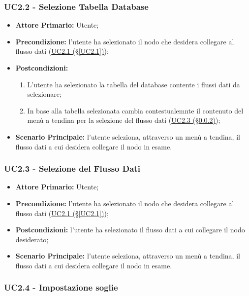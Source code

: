 \subsubsection{UC2.2 - Selezione Tabella Database}\label{UC2.2}
\begin{itemize}
\item \textbf{Attore Primario:} Utente;
\item \textbf{Precondizione:} l'utente ha selezionato il nodo che desidera collegare al flusso dati 					(\hyperref[UC2.1]{UC2.1 (§\ref*{UC2.1})});
\item \textbf{Postcondizioni:}
	\begin{enumerate}
	\item L'utente ha selezionato la tabella del database contente i flussi dati da selezionare;
	\item In base alla tabella selezionata cambia contestualemnte il contenuto del menù a tendina per la selezione del flusso dati (\hyperref[UC2.3]{UC2.3 (§\ref*{UC2.3})});
	\end{enumerate}
\item \textbf{Scenario Principale:} l'utente seleziona, attraverso un menù a tendina, il flusso dati a cui desidera collegare il nodo in esame.
\end{itemize}

\subsubsection{UC2.3 - Selezione del Flusso Dati}\label{UC2.3}
\begin{itemize}
	\item \textbf{Attore Primario:} Utente;
	\item \textbf{Precondizione:} l'utente ha selezionato il nodo che desidera collegare al flusso dati 						(\hyperref[UC2.1]{UC2.1 (§\ref*{UC2.1})});
	\item \textbf{Postcondizioni:} l'utente ha selezionato il flusso dati a cui collegare il nodo desiderato;
	\item \textbf{Scenario Principale:} l'utente seleziona, attraverso un menù a tendina, il flusso dati a cui desidera collegare il nodo in esame.
\end{itemize}

\pagebreak

\subsubsection{UC2.4 - Impostazione soglie}\label{UC2.4}

